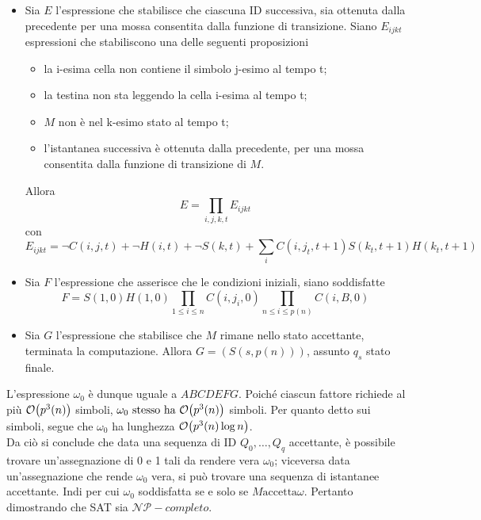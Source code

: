 \documentclass{subfiles}
\begin{document}
\begin{Theorem*}[di Cook]
\begin{Proof*}
\begin{itemize}
            \item Sia \(E\) l'espressione che stabilisce che ciascuna ID successiva, sia ottenuta dalla precedente per una mossa consentita dalla funzione di transizione.
                  Siano \(E_{ijkt}\) espressioni che stabiliscono una delle seguenti proposizioni
                  \begin{itemize}
                      \item la i-esima cella non contiene il simbolo j-esimo al tempo t;
                      \item la testina non sta leggendo la cella i-esima al tempo t;
                      \item \(M\) non è nel k-esimo stato al tempo t;
                      \item l'istantanea successiva è ottenuta dalla precedente, per una mossa consentita dalla funzione di transizione di \(M\).
                  \end{itemize}
                  Allora
                  \[
                      E = \prod\limits_{i,j,k,t}{E_{ijkt}}
                  \]
                  con
                  \[
                      E_{ijkt} = \lnot C(i,j,t) + \lnot H(i,t) + \lnot S(k, t) + \sum\limits_{i}{C(i, j_{t}, t + 1) S(k_{t}, t + 1) H(k_{t}, t + 1)}
                  \]

            \item Sia \(F\) l'espressione che asserisce che le condizioni iniziali, siano soddisfatte
                  \[
                      F = S(1, 0)H(1, 0) \prod\limits_{1 \le i \le n}{C(i, j_{i}, 0)} \prod\limits_{n \le i \le p(n)}{C(i, B, 0)}
                  \]

            \item Sia \(G\) l'espressione che stabilisce che \(M\) rimane nello stato accettante, terminata la computazione.
                  Allora \(G = (S(s, p(n)))\), assunto \(q_{s}\) stato finale.
        \end{itemize}

        \noindent L'espressione \(\omega_{0}\) è dunque uguale a \(ABCDEFG\). Poiché ciascun fattore richiede al più \(\order{p^{3}(n)}\) simboli,
        \(\omega_{0} \text{stesso ha} \order{p^{3}(n)}\) simboli. Per quanto detto sui simboli, segue che \(\omega_{0}\) ha lunghezza \(\order{p^{3}(n)\log n}\).
        \\
        Da ciò si conclude che data una sequenza di ID \(Q_{0}, \ldots, Q_{q}\) accettante, è possibile trovare un'assegnazione di 0 e 1 tali da rendere vera \(\omega_{0}\);
        viceversa data un'assegnazione che rende \(\omega_{0}\) vera, si può trovare una sequenza di istantanee accettante. Indi per cui \(\omega_{0}\) soddisfatta se e solo se \(M \text{accetta} \omega\).
        Pertanto dimostrando che SAT sia \(\mathcal{NP}-completo\).
    \end{Proof*}
\end{Theorem*}
\end{document}
